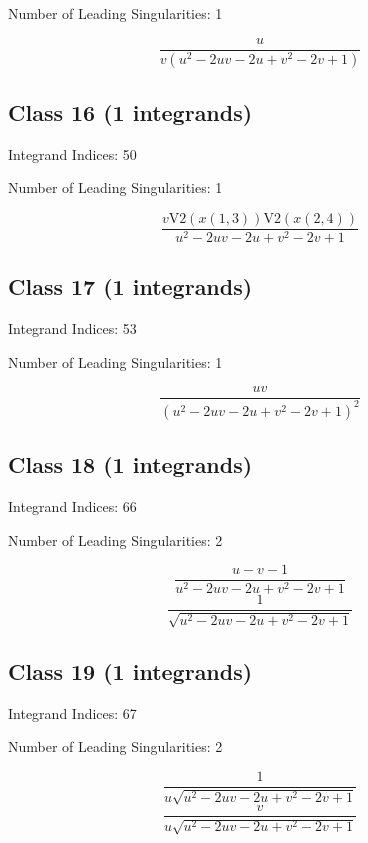 \documentclass[11pt,a4paper]{article}
\begin{document}
Number of Leading Singularities: 1

\begin{equation}
\frac{u}{v \left(u^2-2 u v-2 u+v^2-2 v+1\right)}
\end{equation}


\subsection*{Class 16 (1 integrands)}
Integrand Indices: 50

Number of Leading Singularities: 1

\begin{equation}
\frac{v \text{V2}(x(1,3)) \text{V2}(x(2,4))}{u^2-2 u v-2 u+v^2-2 v+1}
\end{equation}


\subsection*{Class 17 (1 integrands)}
Integrand Indices: 53

Number of Leading Singularities: 1

\begin{equation}
\frac{u v}{\left(u^2-2 u v-2 u+v^2-2 v+1\right)^2}
\end{equation}


\subsection*{Class 18 (1 integrands)}
Integrand Indices: 66

Number of Leading Singularities: 2

\begin{equation}
\frac{u-v-1}{u^2-2 u v-2 u+v^2-2 v+1}
\end{equation}
\begin{equation}
\frac{1}{\sqrt{u^2-2 u v-2 u+v^2-2 v+1}}
\end{equation}


\subsection*{Class 19 (1 integrands)}
Integrand Indices: 67

Number of Leading Singularities: 2

\begin{equation}
\frac{1}{u \sqrt{u^2-2 u v-2 u+v^2-2 v+1}}
\end{equation}
\begin{equation}
\frac{v}{u \sqrt{u^2-2 u v-2 u+v^2-2 v+1}}
\end{equation}
\end{document}
